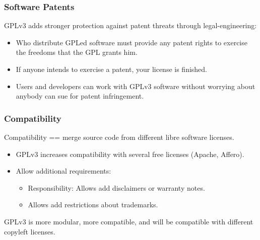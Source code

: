 
\begin{frame}
\frametitle{Software Patents}
GPLv3 adds stronger protection against patent threats through legal-engineering:

\begin{itemize}
\item Who distribute GPLed software must provide any patent rights to exercise the freedoms that the GPL grants him.
\item If anyone intends to exercise a patent, your license is finished.
\item Users and developers can work with GPLv3 software without worrying about anybody can sue for patent infringement.
\end{itemize}


\end{frame}


\begin{frame}
\frametitle{Compatibility}

Compatibility == merge source code from different libre software licenses.

\begin{itemize}
\item GPLv3 increases compatibility with several free licenses (Apache, Affero).
\item Allow additional requirements:
\begin{itemize}
\item Responsibility: Allows add disclaimers or warranty notes.
\item Allows add restrictions about trademarks.
\end{itemize}
\end{itemize}

GPLv3 is more modular, more compatible, and will be compatible with different copyleft licenses.

\end{frame}


